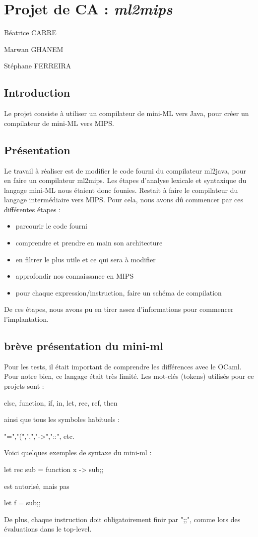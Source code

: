 \documentclass[a4paper, 11pt]{report}
\begin{document}
\chapter{Projet de CA : \emph{ml2mips}}

Béatrice CARRE

Marwan GHANEM

Stéphane FERREIRA

\section*{Introduction}
Le projet consiste à utiliser un compilateur de mini-ML vers Java, pour créer un compilateur de mini-ML vers MIPS.

\section{Présentation}
Le travail à réaliser est de modifier le code fourni du compilateur
ml2java, pour en faire un compilateur ml2mips.
Les étapes d'analyse lexicale et syntaxique du langage mini-ML nous étaient
donc founies. Restait à faire le compilateur du langage intermédiaire
vers MIPS. 
Pour cela, nous avons dû commencer par ces différentes étapes :
\begin{itemize}
\item parcourir le code fourni
\item comprendre et prendre en main son architecture
\item en filtrer le plus utile et ce qui sera à modifier
\item approfondir nos connaissance en MIPS
\item pour chaque expression/instruction, faire un schéma de compilation
\end{itemize}
De ces étapes, nous avons pu en tirer assez d'informations pour
commencer l'implantation.

\section{brève présentation du mini-ml}
Pour les tests, il était important de comprendre les différences avec
le OCaml. Pour notre bien, ce langage était très limité.
Les mot-clés (tokens) utilisés pour ce projets sont :
\begin{OCaml}
else, function, if, in, let, rec, ref, then
\end{OCaml}
ainsi que tous les symboles habituels :
\begin{OCaml}
"=","(",",","->","::", etc.
\end{OCaml}
Voici quelques exemples de syntaxe du mini-ml :
\begin{OCaml}
let rec sub = function x -> sub;;
\end{OCaml}
est autorisé, mais pas 
\begin{OCaml}
let f = sub;;
\end{OCaml}
De plus, chaque instruction doit obligatoirement finir par ";;", comme
lors des évaluations dans le top-level.
 
\end{document}
